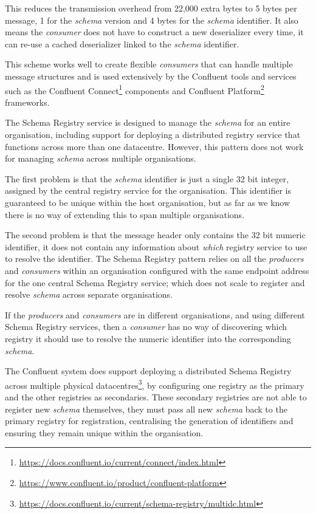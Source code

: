 \documentclass{article}
\newcommand{\datacentre} {datacentre\xspace}
\newcommand{\datacentres} {datacentres\xspace}
\newcommand{\kfconsumer} {\textit{consumer}\xspace}
\newcommand{\kfconsumers} {\textit{consumers}\xspace}
\newcommand{\kfproducers} {\textit{producers}\xspace}
\newcommand{\confluent} {Confluent\xspace}
\newcommand{\avschema} {\textit{schema}\xspace}
\newcommand{\conschemareg} {registry\xspace}
\newcommand{\conschemaregs} {registries\xspace}
\newcommand{\conschemaregistry} {Schema Registry\xspace}
\newcommand{\deserzer}  {deserializer\xspace}
\newcommand{\footurl}[1] {\footnote{\url{#1}}}
\begin{document}
This reduces the transmission overhead from 22,000 extra bytes to 5 bytes per message, 1 for the \avschema version and 4 bytes for the \avschema identifier. It also means the \kfconsumer does not have to construct a new \deserzer every time, it can re-use a cached \deserzer linked to the \avschema identifier.

This scheme works well to create flexible \kfconsumers that can handle multiple message structures and is used extensively by the \confluent tools and services such as the \confluent Connect\footurl{https://docs.confluent.io/current/connect/index.html} components and \confluent Platform\footurl{https://www.confluent.io/product/confluent-platform} frameworks.

The \conschemaregistry service is designed to manage the \avschema for an entire organisation, including support for deploying a distributed registry service that functions across more than one \datacentre.
However, this pattern does not work for managing \avschema across multiple organisations.

The first problem is that the \avschema identifier is just a single 32 bit integer, assigned by the central registry service for the organisation. This identifier is guaranteed to be unique within the host organisation, but as far as we know there is no way of extending this to span multiple organisations.

The second problem is that the message header only contains the 32 bit numeric identifier, it does not contain any information about \textit{which} \conschemareg service to use to resolve the identifier.
The \conschemaregistry pattern relies on all the \kfproducers and \kfconsumers within an organisation configured with the same endpoint address for the one central \conschemaregistry service; which does not scale to register and resolve \avschema across separate organisations.

If the \kfproducers and \kfconsumers are in different organisations, and using different \conschemaregistry services, then a \kfconsumer has no way of discovering which \conschemareg it should use to resolve the numeric identifier into the corresponding \avschema.

The \confluent system does support deploying a distributed \conschemaregistry across multiple physical \datacentres\footurl{https://docs.confluent.io/current/schema-registry/multidc.html}, by configuring one \conschemareg as the primary and the other \conschemaregs as secondaries.
These secondary \conschemaregs are not able to register new \avschema themselves, they must pass all new \avschema back to the primary \conschemareg for registration, centralising the  generation of identifiers and ensuring they remain unique within the organisation.
\end{document}

